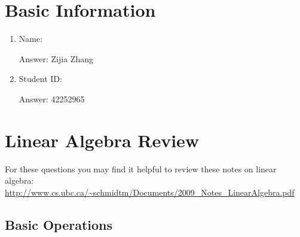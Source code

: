 \documentclass{article}
\def\ans#1{\par\gre{Answer: #1}}
\def\blu#1{{\color{blu}#1}}
\def\gre#1{{\color{gre}#1}}
\def\enum#1{\begin{enumerate}#1\end{enumerate}}
\begin{document}
\section*{Basic Information}


\blu{\enum{
\item Name:
\ans{
Zijia Zhang
}
\item Student ID:
\ans{42252965}
}
}


\section{Linear Algebra Review}

For these questions you may find it helpful to review these notes on linear algebra:\\
\url{http://www.cs.ubc.ca/~schmidtm/Documents/2009_Notes_LinearAlgebra.pdf}

\subsection{Basic Operations}
\end{document}
